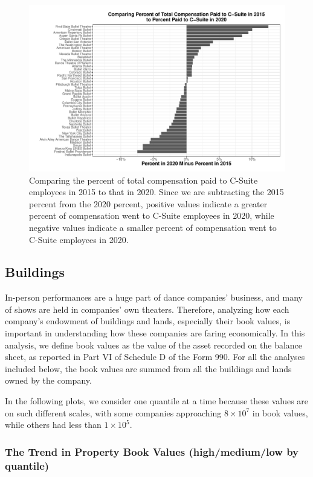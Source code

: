 \documentclass[Dance Data
Project,article,submit,moreauthors,pdftex]{mdpi}
\begin{document}
\begin{figure}[H]
\includegraphics[width=0.9\linewidth,]{../images/csuite-comp-bar} \caption{\label{fig:csuite-comp-bar} Comparing the percent of total compensation paid to C-Suite employees in 2015 to that in 2020. Since we are subtracting the 2015 percent from the 2020 percent, positive values indicate a greater percent of compensation went to C-Suite employees in 2020, while negative values indicate a smaller percent of compensation went to C-Suite employees in 2020.}\label{fig:unnamed-chunk-18}
\end{figure}

\hypertarget{buildings}{%
\subsection{Buildings}\label{buildings}}

In-person performances are a huge part of dance companies' business, and
many of shows are held in companies' own theaters. Therefore, analyzing
how each company's endowment of buildings and lands, especially their
book values, is important in understanding how these companies are
faring economically. In this analysis, we define book values as the
value of the asset recorded on the balance sheet, as reported in Part VI
of Schedule D of the Form 990. For all the analyses included below, the
book values are summed from all the buildings and lands owned by the
company.

In the following plots, we consider one quantile at a time because these
values are on such different scales, with some companies approaching
\(8 \times 10^7\) in book values, while others had less than
\(1 \times 10^5\).

\hypertarget{the-trend-in-property-book-values-highmediumlow-by-quantile}{%
\subsubsection{The Trend in Property Book Values (high/medium/low by
quantile)}\label{the-trend-in-property-book-values-highmediumlow-by-quantile}}
\end{document}
